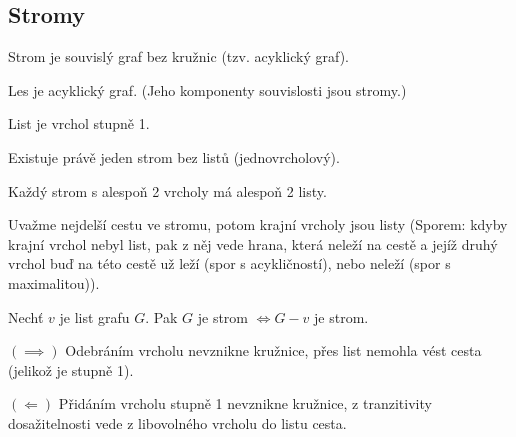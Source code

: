 \documentclass[12pt]{article}					%
\begin{document}
    \subsection{Stromy}
        \begin{definice}[Strom]
            Strom je souvislý graf bez kružnic (tzv. acyklický graf).
        \end{definice}

        \begin{definice}[Les]
            Les je acyklický graf. (Jeho komponenty souvislosti jsou stromy.)
        \end{definice}

        \begin{definice}[List]
            List je vrchol stupně 1.
        \end{definice}

        \begin{upozorneni}
            Existuje právě jeden strom bez listů (jednovrcholový).
        \end{upozorneni}

        \begin{lemma}
            Každý strom s alespoň 2 vrcholy má alespoň 2 listy.
            \begin{dukazin}
                Uvažme nejdelší cestu ve stromu, potom krajní vrcholy jsou listy (Sporem: kdyby krajní vrchol nebyl list, pak z něj vede hrana, která neleží na cestě a jejíž druhý vrchol buď na této cestě už leží (spor s acykličností), nebo neleží (spor s maximalitou)).
            \end{dukazin}
        \end{lemma}

        \begin{lemma}
            Nechť $v$ je list grafu $G$. Pak $G$ je strom $\Leftrightarrow G - v$ je strom.
            \begin{dukazin}
                $(\implies)$ Odebráním vrcholu nevznikne kružnice, přes list nemohla vést cesta (jelikož je stupně 1).

                $(\Leftarrow)$ Přidáním vrcholu stupně 1 nevznikne kružnice, z tranzitivity dosažitelnosti vede z libovolného vrcholu do listu cesta.
            \end{dukazin}
        \end{lemma}

\end{document}
